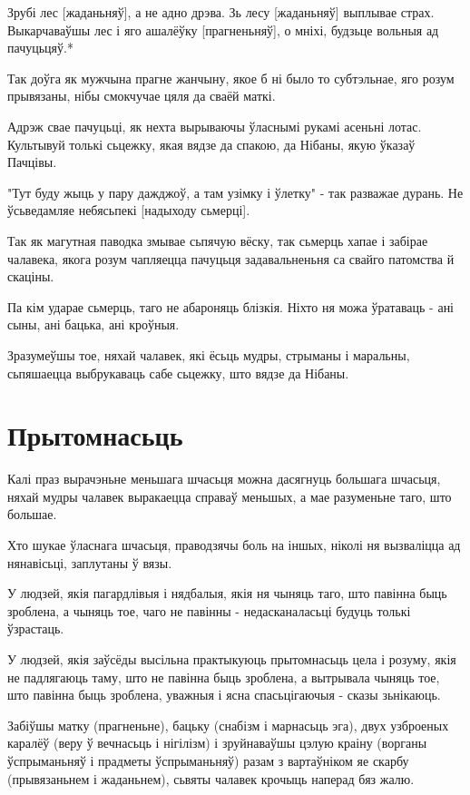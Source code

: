 \documentclass{article}
\begin{document}
Зрубі лес {[}жаданьняў{]}, а не адно дрэва. Зь лесу {[}жаданьняў{]}
выплывае страх. Выкарчаваўшы лес і яго ашалёўку {[}прагненьняў{]}, о
мніхі, будзьце вольныя ад пачуцьцяў.*

Так доўга як мужчына прагне жанчыну, якое б ні было то субтэльнае,
яго розум прывязаны, нібы смокчучае цяля да сваёй маткі.

Адрэж свае пачуцьці, як нехта вырываючы ўласнымі рукамі асеньні
лотас. Культывуй толькі сьцежку, якая вядзе да спакою, да Нібаны, якую
ўказаў Пачцівы.

"Тут буду жыць у пару дажджоў, а там узімку і ўлетку" - так
разважае дурань. Не ўсьведамляе небясьпекі {[}надыходу сьмерці{]}.

Так як магутная паводка змывае сьпячую вёску, так сьмерць хапае і
забірае чалавека, якога розум чапляецца пачуцьця задавальненьня са
свайго патомства й скаціны.

Па кім ударае сьмерць, таго не абароняць блізкія. Ніхто ня можа
ўратаваць - ані сыны, ані бацька, ані кроўныя.

Зразумеўшы тое, няхай чалавек, які ёсьць мудры, стрыманы і
маральны, сьпяшаецца выбрукаваць сабе сьцежку, што вядзе да Нібаны.

\section{Прытомнасьць}

Калі праз вырачэньне меньшага шчасьця можна дасягнуць большага
шчасьця, няхай мудры чалавек выракаецца справаў меньшых, а мае
разуменьне таго, што большае.

Хто шукае ўласнага шчасьця, праводзячы боль на іншых, ніколі ня
вызваліцца ад нянавісьці, заплутаны ў вязы.

У людзей, якія пагардлівыя і нядбалыя, якія ня чыняць таго, што
павінна быць зроблена, а чыняць тое, чаго не павінны - недасканаласьці
будуць толькі ўзрастаць.

У людзей, якія заўсёды высільна практыкуюць прытомнасьць цела і
розуму, якія не падлягаюць таму, што не павінна быць зроблена, а
вытрывала чыняць тое, што павінна быць зроблена, уважныя і ясна
спасьцігаючыя - сказы зьнікаюць.

Забіўшы матку (прагненьне), бацьку (снабізм і марнасьць эга), двух
узброеных каралёў (веру ў вечнасьць і нігілізм) і зруйнаваўшы цэлую
краіну (ворганы ўспрыманьняў і прадметы ўспрыманьняў) разам з
вартаўніком яе скарбу (прывязаньнем і жаданьнем), сьвяты чалавек крочыць
наперад бяз жалю.
\end{document}
